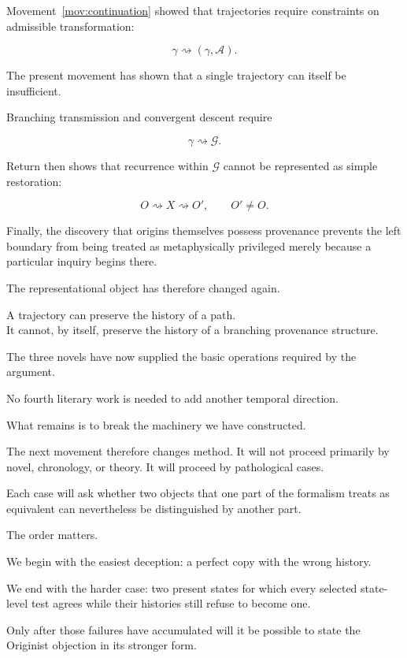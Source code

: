 \documentclass[
  11pt,
  a4paper,
  DIV=12,
  BCOR=0mm,
  parskip=half-
]{scrartcl}
\newcommand{\graphG}{\mathcal G}
\newcommand{\Adm}{\mathcal A}
\newcommand{\leadsto}{\rightsquigarrow}
\theoremstyle{definition}
\theoremstyle{plain}
\theoremstyle{remark}
\begin{document}
Movement~\ref{mov:continuation} showed that trajectories require constraints
on admissible transformation:

\[
  \gamma
  \rightsquigarrow
  (\gamma,\Adm).
\]

The present movement has shown that a single trajectory can itself be
insufficient.

Branching transmission and convergent descent require

\[
  \gamma
  \rightsquigarrow
  \graphG.
\]

Return then shows that recurrence within \(\graphG\) cannot be represented as
simple restoration:

\[
  O
  \leadsto
  X
  \leadsto
  O',
  \qquad
  O'\neq O.
\]

Finally, the discovery that origins themselves possess provenance prevents
the left boundary from being treated as metaphysically privileged merely
because a particular inquiry begins there.

The representational object has therefore changed again.

\begin{held}
\centering
A trajectory can preserve the history of a path.\\[3pt]
It cannot, by itself, preserve the history of a branching provenance
structure.
\end{held}

The three novels have now supplied the basic operations required by the
argument.

No fourth literary work is needed to add another temporal direction.

What remains is to break the machinery we have constructed.

The next movement therefore changes method. It will not proceed primarily by
novel, chronology, or theory. It will proceed by pathological cases.

Each case will ask whether two objects that one part of the formalism treats
as equivalent can nevertheless be distinguished by another part.

The order matters.

We begin with the easiest deception: a perfect copy with the wrong history.

We end with the harder case: two present states for which every selected
state-level test agrees while their histories still refuse to become one.

Only after those failures have accumulated will it be possible to state the
Originist objection in its stronger form.
\end{document}
